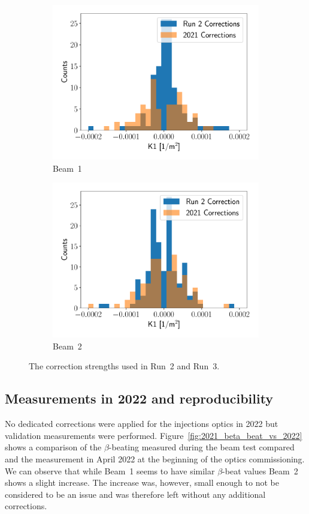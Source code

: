 \documentclass[a4paper]{cernatsnote}
\begin{document}
\begin{figure}[ht]
\begin{subfigure}{.5\textwidth}
  \centering
  \includegraphics[width=.9\linewidth]{beam1_corrections.pdf}  
  \caption{Beam~1}
\end{subfigure}
\begin{subfigure}{.5\textwidth}
  \centering
  \includegraphics[width=.9\linewidth]{beam2_corrections.pdf}  
  \caption{Beam~2}
\end{subfigure}
\caption{The correction strengths used in Run~2 and Run~3.}
\label{fig:corrector_strength_injection}
\end{figure}



\subsection{Measurements in 2022 and reproducibility}\label{sec:repro}
No dedicated corrections were applied for the injections optics in 2022 but validation measurements were performed. Figure~\ref{fig:2021_beta_beat_vs_2022} shows a comparison of the $\beta$-beating measured during the beam test compared and the measurement in April 2022 at the beginning of the optics commissioning. We can observe that while Beam~1 seems to have similar $\beta$-beat values Beam~2 shows a slight increase. The increase was, however, small enough to not be considered to be an issue and was therefore left without any additional corrections. 
\end{document}
